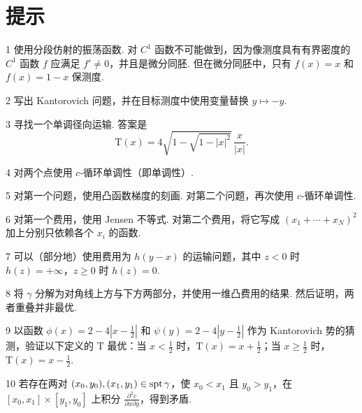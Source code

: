 \clearpage{}\section*{提示}\label{sec:hints}
\begin{sourcehint}{1}
使用分段仿射的振荡函数. 对 $C^1$ 函数不可能做到，因为像测度具有有界密度的 $C^1$ 函数 $f$ 应满足 $f'\neq0$，并且是微分同胚. 但在微分同胚中，只有 $f(x)=x$ 和 $f(x)=1-x$ 保测度.
\end{sourcehint}
\begin{sourcehint}{2}
写出 Kantorovich 问题，并在目标测度中使用变量替换 $y\mapsto-y$.
\end{sourcehint}
\begin{sourcehint}{3}
寻找一个单调径向运输. 答案是
\[
\mathrm T(x)=4\sqrt{1-\sqrt{1-|x|^2}}\,\frac{x}{|x|}.
\]
\end{sourcehint}
\begin{sourcehint}{4}
对两个点使用 $c$-循环单调性（即单调性）.
\end{sourcehint}
\begin{sourcehint}{5}
对第一个问题，使用凸函数梯度的刻画. 对第二个问题，再次使用 $c$-循环单调性.
\end{sourcehint}
\begin{sourcehint}{6}
对第一个费用，使用 Jensen 不等式. 对第二个费用，将它写成 $(x_1+\cdots+x_N)^2$ 加上分别只依赖各个 $x_i$ 的函数.
\end{sourcehint}
\begin{sourcehint}{7}
可以（部分地）使用费用为 $h(y-x)$ 的运输问题，其中 $z<0$ 时 $h(z)=+\infty$，$z\geq0$ 时 $h(z)=0$.
\end{sourcehint}
\begin{sourcehint}{8}
将 $\gamma$ 分解为对角线上方与下方两部分，并使用一维凸费用的结果. 然后证明，两者重叠并非最优.
\end{sourcehint}
\begin{sourcehint}{9}
以函数 $\phi(x)=2-4|x-\frac12|$ 和 $\psi(y)=2-4|y-\frac12|$ 作为 Kantorovich 势的猜测，验证以下定义的 $\mathrm T$ 最优：当 $x<\frac12$ 时，$\mathrm T(x)=x+\frac12$；当 $x\geq\frac12$ 时，$\mathrm T(x)=x-\frac12$.
\end{sourcehint}
\begin{sourcehint}{10}
若存在两对 $(x_0,y_0),(x_1,y_1)\in\operatorname{spt}\gamma$，使 $x_0<x_1$ 且 $y_0>y_1$，在 $[x_0,x_1]\times[y_1,y_0]$ 上积分 $\frac{\partial^2c}{\partial x\partial y}$，得到矛盾.
\end{sourcehint}
